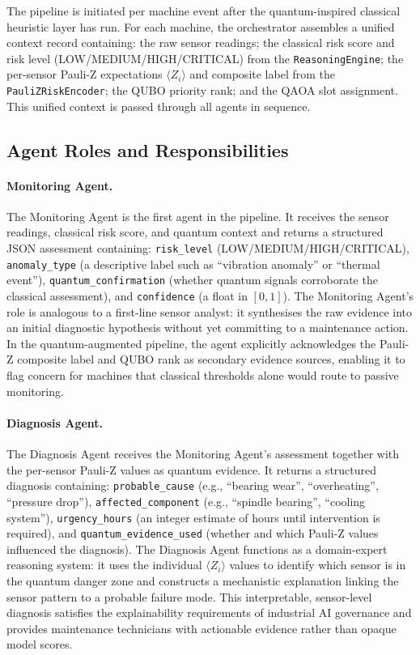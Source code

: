 The pipeline is initiated per machine event after the quantum-inspired classical heuristic layer has run. For each machine, the orchestrator assembles a unified context record containing: the raw sensor readings; the classical risk score and risk level (LOW/MEDIUM/HIGH/CRITICAL) from the \texttt{ReasoningEngine}; the per-sensor Pauli-Z expectations $\langle Z_i \rangle$ and composite label from the \texttt{PauliZRiskEncoder}; the QUBO priority rank; and the QAOA slot assignment. This unified context is passed through all agents in sequence.

\subsection{Agent Roles and Responsibilities}

\paragraph{Monitoring Agent.}
The Monitoring Agent is the first agent in the pipeline. It receives the sensor readings, classical risk score, and quantum context and returns a structured JSON assessment containing: \texttt{risk\_level} (LOW/MEDIUM/HIGH/CRITICAL), \texttt{anomaly\_type} (a descriptive label such as ``vibration anomaly'' or ``thermal event''), \texttt{quantum\_confirmation} (whether quantum signals corroborate the classical assessment), and \texttt{confidence} (a float in $[0,1]$). The Monitoring Agent's role is analogous to a first-line sensor analyst: it synthesises the raw evidence into an initial diagnostic hypothesis without yet committing to a maintenance action. In the quantum-augmented pipeline, the agent explicitly acknowledges the Pauli-Z composite label and QUBO rank as secondary evidence sources, enabling it to flag concern for machines that classical thresholds alone would route to passive monitoring.

\paragraph{Diagnosis Agent.}
The Diagnosis Agent receives the Monitoring Agent's assessment together with the per-sensor Pauli-Z values as quantum evidence. It returns a structured diagnosis containing: \texttt{probable\_cause} (e.g., ``bearing wear'', ``overheating'', ``pressure drop''), \texttt{affected\_component} (e.g., ``spindle bearing'', ``cooling system''), \texttt{urgency\_hours} (an integer estimate of hours until intervention is required), and \texttt{quantum\_evidence\_used} (whether and which Pauli-Z values influenced the diagnosis). The Diagnosis Agent functions as a domain-expert reasoning system: it uses the individual $\langle Z_i \rangle$ values to identify which sensor is in the quantum danger zone and constructs a mechanistic explanation linking the sensor pattern to a probable failure mode. This interpretable, sensor-level diagnosis satisfies the explainability requirements of industrial AI governance and provides maintenance technicians with actionable evidence rather than opaque model scores.

